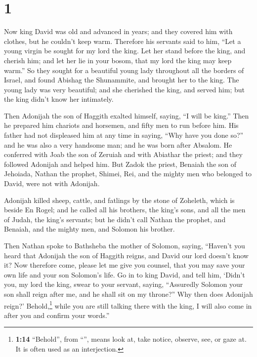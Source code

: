 \hypertarget{section}{%
\section{1}\label{section}}

 Now king David was old and advanced in years; and they
covered him with clothes, but he couldn't keep warm. 
Therefore his servants said to him, ``Let a young virgin be sought for
my lord the king. Let her stand before the king, and cherish him; and
let her lie in your bosom, that my lord the king may keep warm.''
 So they sought for a beautiful young lady throughout all
the borders of Israel, and found Abishag the Shunammite, and brought her
to the king.  The young lady was very beautiful; and she
cherished the king, and served him; but the king didn't know her
intimately.

 Then Adonijah the son of Haggith exalted himself, saying,
``I will be king.'' Then he prepared him chariots and horsemen, and
fifty men to run before him.  His father had not
displeased him at any time in saying, ``Why have you done so?'' and he
was also a very handsome man; and he was born after Absalom.
 He conferred with Joab the son of Zeruiah and with
Abiathar the priest; and they followed Adonijah and helped him.
 But Zadok the priest, Benaiah the son of Jehoiada, Nathan
the prophet, Shimei, Rei, and the mighty men who belonged to David, were
not with Adonijah.

 Adonijah killed sheep, cattle, and fatlings by the stone
of Zoheleth, which is beside En Rogel; and he called all his brothers,
the king's sons, and all the men of Judah, the king's servants;
 but he didn't call Nathan the prophet, and Benaiah, and
the mighty men, and Solomon his brother.

 Then Nathan spoke to Bathsheba the mother of Solomon,
saying, ``Haven't you heard that Adonijah the son of Haggith reigns, and
David our lord doesn't know it?  Now therefore come,
please let me give you counsel, that you may save your own life and your
son Solomon's life.  Go in to king David, and tell him,
`Didn't you, my lord the king, swear to your servant, saying,
``Assuredly Solomon your son shall reign after me, and he shall sit on
my throne?'' Why then does Adonijah reign?' 
Behold,\footnote{\textbf{1:14} ``Behold'', from ``'', means
  look at, take notice, observe, see, or gaze at. It is often used as an
  interjection.} while you are still talking there with the king, I will
also come in after you and confirm your words.''

